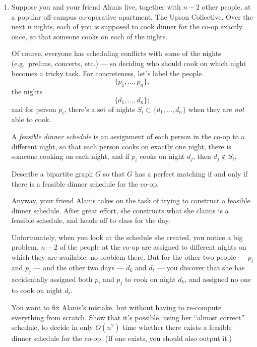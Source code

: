 \documentclass[12pt]{article}
\begin{document}
\begin{enumerate}
{}


\item 

Suppose you and your friend Alanis live, together with $n-2$
other people, at a popular off-campus co-operative apartment,
The Upson Collective.
Over the next $n$ nights, each of you is supposed to cook
dinner for the co-op exactly once, so that someone
cooks on each of the nights.

Of course, everyone has scheduling conflicts with some of
the nights (e.g.~prelims, concerts, etc.) ---
so deciding who should cook on which night becomes a tricky task.
For concreteness, let's label the people
$$\{p_1, \ldots, p_n\},$$
the nights
$$\{d_1, \ldots, d_n\};$$
and for person $p_i$, there's a set of nights
$S_i \subset \{d_1, \ldots, d_n\}$
when they are {\em not} able to cook.

A {\em feasible dinner schedule} is an assignment of each
person in the co-op to a different night, so that
each person cooks on exactly one night,
there is someone cooking on each night,
and if $p_i$ cooks on night $d_j$, then $d_j \not\in S_i$.

Describe a bipartite graph $G$ so that $G$ has
a perfect matching if and only if there is
a feasible dinner schedule for the co-op.

Anyway, your friend Alanis takes on the task of trying to
construct a feasible dinner schedule.
After great effort, she constructs what she claims
is a feasible schedule, and heads off to class for the day.

Unfortunately, when you look at the schedule she created,
you notice a big problem.
$n-2$ of the people at the co-op are assigned to
different nights on which they are available: no problem there.
But for the other two people
--- $p_i$ and $p_j$ ---
and the other two days
--- $d_k$ and $d_\ell$ ---
you discover that she has accidentally
assigned both $p_i$ and $p_j$ to cook on night $d_k$,
and assigned no one to cook on night $d_\ell$.

You want to fix Alanis's mistake, but without having
to re-compute everything from scratch.
Show that it's possible, using her ``almost correct'' schedule,
to decide in only $O(n^2)$ time
whether there exists a feasible dinner schedule for the co-op.
(If one exists, you should also output it.)



\end{enumerate}
\end{document}

